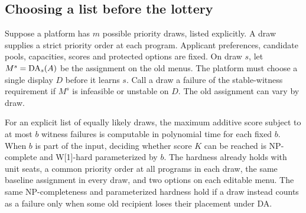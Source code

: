 \subsection{Choosing a list before the lottery}\label{sec:scenario-boundary}
Suppose a platform has $m$ possible priority draws, listed explicitly.
A draw supplies a strict priority order at each program. Applicant preferences,
candidate pools, capacities, scores and protected options are fixed.
On draw $s$, let $M^s=\operatorname{DA}_s(A)$ be the assignment on the old menus.
The platform must choose a single display $D$ before it learns $s$.
Call a draw a failure of the stable-witness requirement if $M^s$ is infeasible or unstable on $D$.
The old assignment can vary by draw.

\begin{theorem}\label{thm:scenario-budget}
For an explicit list of equally likely draws, the maximum additive score subject to at most $b$ witness failures is computable in polynomial time for each fixed $b$. When $b$ is part of the input, deciding whether score $K$ can be reached is NP-complete and W[1]-hard parameterized by $b$. The hardness already holds with unit seats, a common priority order at all programs in each draw, the same baseline assignment in every draw, and two options on each editable menu. The same NP-completeness and parameterized hardness hold if a draw instead counts as a failure only when some old recipient loses their placement under DA.
\end{theorem}
